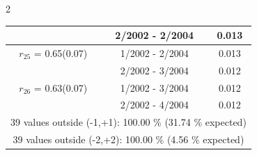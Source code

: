 \begin{multicols}{2}
{\begin{tabular}{ccc}
&        2/2002 -  2/2004 &        0.013  \vspace{-.02in} \\ \hline 
  $r_{25}$ = 0.65(0.07) &       1/2002 -  2/2004 &        0.013   \vspace{-.10in} \\  
&        2/2002 -  3/2004 &        0.012  \vspace{-.02in} \\ \hline 
  $r_{26}$ = 0.63(0.07) &       1/2002 -  3/2004 &        0.012   \vspace{-.10in} \\  
&        2/2002 -  4/2004 &        0.012  \vspace{-.02in} \\ \hline 
\multicolumn{3}{c}{              39 values outside (-1,+1): 100.00  \% (31.74  \% expected)}\vspace{-.10in} \\ 
\multicolumn{3}{c}{              39 values outside (-2,+2): 100.00 \%  (4.56 \% expected) } \\
 \end{tabular} \\ 
 } 
\end{multicols} 
